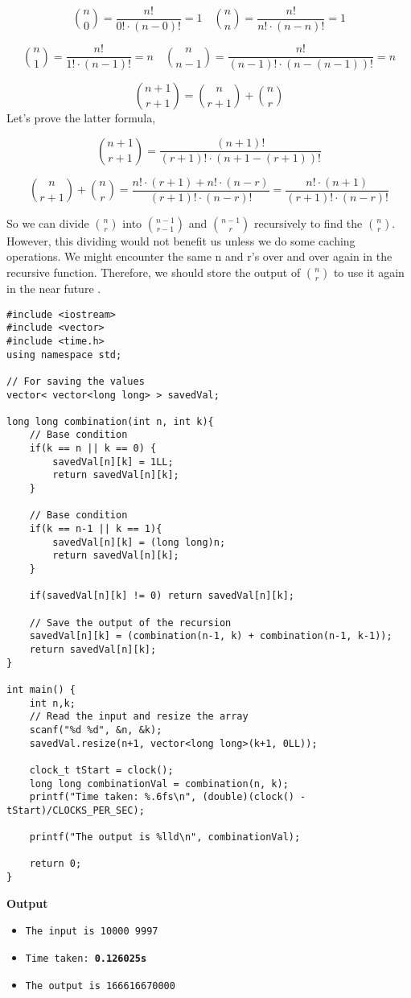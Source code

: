 \documentclass[12pt]{article}
\begin{document}
\[\binom n0 = \frac{n!}{0! \cdot (n-0)!} = 1 \quad \binom nn = \frac{n!}{n! \cdot (n-n)!} = 1\]

\[\binom n1 = \frac{n!}{1! \cdot (n-1)!} = n \quad \binom n{n-1} = \frac{n!}{(n-1)! \cdot (n-(n-1))!} = n\]

\[\binom {n+1}{r+1} = \binom {n}{r+1} + \binom {n}{r}\]
Let's prove the latter formula,

\[ \binom {n+1}{r+1} = \frac{(n+1)!}{(r+1)! \cdot (n+1-(r+1))!}\]

\[  \binom {n}{r+1} + \binom {n}{r} = \frac{n!\cdot(r+1) + n!\cdot(n-r)}{(r+1)! \cdot (n-r)!} = \frac{n!\cdot(n+1)}{(r+1)! \cdot (n-r)!}\]

So we can divide  $\binom{n}{r}$ into $\binom{n-1}{r-1}$ and $\binom{n-1}{r}$ recursively to find the $\binom{n}{r}$. However, this dividing would not benefit us unless we do some caching operations. We might encounter the same n and r's  over and over again in the recursive function. Therefore, we should store the output of $\binom{n}{r}$ to use it again in the near future \cite{combinationfind}.
\clearpage

\begin{verbatim}
#include <iostream>
#include <vector>
#include <time.h>
using namespace std;

// For saving the values
vector< vector<long long> > savedVal;

long long combination(int n, int k){
    // Base condition
    if(k == n || k == 0) {
        savedVal[n][k] = 1LL;
        return savedVal[n][k];
    }
    
    // Base condition
    if(k == n-1 || k == 1){
        savedVal[n][k] = (long long)n;
        return savedVal[n][k];
    }
    
    if(savedVal[n][k] != 0) return savedVal[n][k];
    
    // Save the output of the recursion
    savedVal[n][k] = (combination(n-1, k) + combination(n-1, k-1));
    return savedVal[n][k];
}

int main() {
    int n,k;
    // Read the input and resize the array
    scanf("%d %d", &n, &k);
    savedVal.resize(n+1, vector<long long>(k+1, 0LL));
    
    clock_t tStart = clock();
    long long combinationVal = combination(n, k);
    printf("Time taken: %.6fs\n", (double)(clock() - tStart)/CLOCKS_PER_SEC);
    
    printf("The output is %lld\n", combinationVal);
    
    return 0;
}

\end{verbatim}
\textbf{Output}
\begin{itemize}
  \item \texttt{The input is 10000 9997} 
  \item \texttt{Time taken: \textbf{0.126025s}} 
  \item \texttt{The output is 166616670000}
\end{itemize}
\end{document}
